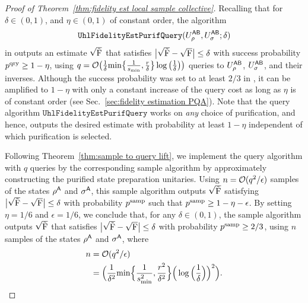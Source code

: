 \begin{proof}[Proof of Theorem~\ref{thm:fidelity est local sample collective}]
    

Recalling that for $\delta \in (0, 1)$, and $\eta \in (0, 1)$ of constant order, the algorithm
\begin{align}
    \mathtt{UhlFidelityEstPurifQuery}(U_\rho^{{\mathsf{A}}{\mathsf{B}}}, U_\sigma^{{\mathsf{A}}{\mathsf{B}}}; \delta)
\end{align}
in  outputs an estimate $\sqrt{\tilde{{\mathrm{F}}}}$ that satisfies $\big|\sqrt{\tilde{{\mathrm{F}}}} - \sqrt{{\mathrm{F}}}\big| \leq \delta$ with success probability $p^{\rm qry} \ge 1-\eta$, using $q = {\mathcal{O}}\big(\frac{1}{\delta}{\rm min}\big\{\frac{1}{s_{\rm min}}, \frac{r}{\delta}\big\}\log{\big(\frac{1}{\delta}\big)}\big)$ queries to $U_\rho^{{\mathsf{A}}{\mathsf{B}}}$, $U_\sigma^{{\mathsf{A}}{\mathsf{B}}}$, and their inverses.
Although the success probability was set to at least $2/3$ in , it can be amplified to $1-\eta$ with only a constant increase of the query cost as long as $\eta$ is of constant order (see Sec.~\ref{sec:fidelity estimation PQA}).
Note that the query algorithm $\mathtt{UhlFidelityEstPurifQuery}$ works on \emph{any} choice of purification, and hence, outputs the desired estimate with probability at least $1 - \eta$ independent of which purification is selected.


Following Theorem~\ref{thm:sample to query lift}, we implement the query algorithm with $q$ queries by the corresponding sample algorithm by approximately constructing the purified state preparation unitaries.
Using $n = {\mathcal{O}}(q^2/\epsilon)$ samples of the states $\rho^{\mathsf{A}}$ and $\sigma^{\mathsf{A}}$, this sample algorithm outputs $\sqrt{\tilde{{\mathrm{F}}}}$ satisfying $\big|\sqrt{\tilde{{\mathrm{F}}}} - \sqrt{{\mathrm{F}}}\big| \leq \delta$ with probability $p^{\rm samp}$ such that $p^{\rm samp} \geq 1 - \eta - \epsilon$.
By setting $\eta = 1/6$ and $\epsilon = 1/6$, we conclude that, for any $\delta \in (0, 1)$, the sample algorithm outputs $\sqrt{\tilde{{\mathrm{F}}}}$ that satisfies $\big|\sqrt{\tilde{{\mathrm{F}}}} - \sqrt{{\mathrm{F}}}\big| \leq \delta$ with probability $p^{\rm samp} \geq 2/3$, using $n$ samples of the states $\rho^{\mathsf{A}}$ and $\sigma^{\mathsf{A}}$, where
\begin{align}
    n 
    &= {\mathcal{O}}(q^2/\epsilon) \\
    &=\Big(\frac{1}{\delta^2}{\rm min}\Big\{\frac{1}{s_{\rm min}^2}, \frac{r^2}{\delta^2}\Big\}\Big(\log{\Big(\frac{1}{\delta}\Big)}\Big)^2\Big).
\end{align}





\end{proof}
